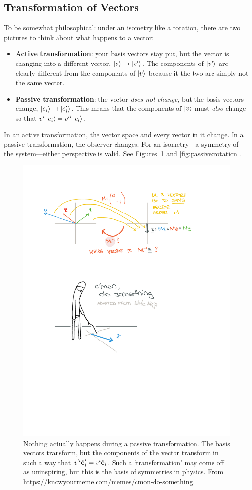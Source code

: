 \documentclass[12pt, oneside]{report}    %
\begin{document}
\subsection{Transformation of Vectors}\label{sec:active:passive}

To be somewhat philosophical: under an isometry like a rotation, there are two pictures to think about what happens to a vector:
\begin{itemize}
    \item \textbf{Active transformation}: your basis vectors stay put, but the vector is changing into a different vector, $\left|v\right\rangle \to \left|v'\right\rangle$. The components of $\left|v'\right\rangle$ are clearly different from the components of $\left|v\right\rangle$ because it the two are simply not the same vector.
    \item \textbf{Passive transformation}: the vector \emph{does not change}, but the basis vectors change, $\left|e_i\right\rangle \to \left|e'_i\right\rangle$. This means that the components of $\left|v\right\rangle$ must \emph{also} change so that $v^i\left|e_i\right\rangle = v'^{i}\left|e_i\right\rangle$.
\end{itemize}
In an active transformation, the vector space and every vector in it change. In a passive transformation, the observer changes. For an isometry---a symmetry of the system---either perspective is valid. See Figures~\ref{fig:do:something} and \ref{fig:passive:rotation}.
% 

\begin{figure}[tb]
    \centering
    \includegraphics[width=.5\textwidth]{figures/passivetransform_dosomething.pdf}
    \caption{
        Nothing actually happens during a passive transformation. The basis vectors transform, but the components of the vector transform in such a way that $v'^i\hat{\mathbf{e}}'_i = v^i\hat{\mathbf{e}}_i$. Such a `transformation' may come off as uninspiring, but this is the basis of symmetries in physics. 
        From \url{https://knowyourmeme.com/memes/cmon-do-something}.
    }
    \label{fig:do:something}
\end{figure}
\end{document}
